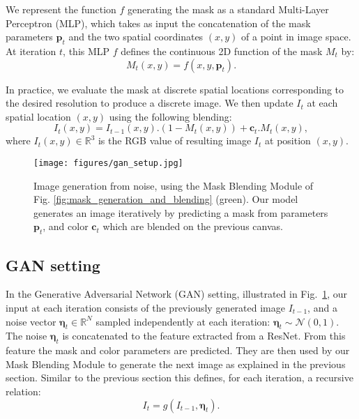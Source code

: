 \documentclass[10pt,twocolumn,letterpaper]{article}
\begin{document}
We represent the function $f$ generating the mask as a standard Multi-Layer Perceptron (MLP), which takes as input the concatenation of the mask parameters $\mathbf{p}_t$ and the two spatial coordinates $(x,y)$ of a point in image space. At iteration $t$, this MLP $f$ defines the continuous 2D function of the mask $M_t$ by:
\begin{equation}
    M_t(x,y) = f(x,y,\mathbf{p}_t).
\end{equation}

In practice, we evaluate the mask at discrete spatial locations corresponding to the desired resolution to produce a discrete image.
We then update $I_{t}$ at each spatial location $(x,y)$ using the following blending: 
\begin{equation}
I_{t}(x,y) = I_{t-1}(x,y).(1-M_{t}(x,y)) + \mathbf{c}_t.M_{t}(x,y),
\label{alpha_blending}
\end{equation}
where $I_{t}(x,y)\in \mathbb{R}^3$ is the RGB value of resulting image $I_t$ at position $(x,y)$.

\begin{figure}[htb]
\centering
\texttt{[image: figures/gan\_setup.jpg]}
\caption{Image generation from noise, using the Mask Blending Module of Fig. \ref{fig:mask_generation_and_blending} (green). Our model generates an image iteratively by predicting a mask from parameters $\mathbf{p}_t$, and color $\mathbf{c}_t$ which are blended on the previous canvas.}
\label{fig:GAN_setup} 
\end{figure}

\subsection{GAN setting}

In the Generative Adversarial Network (GAN) setting, illustrated in Fig.~\ref{fig:GAN_setup}, our input at each iteration consists of the previously generated image $I_{t-1}$, and a noise vector $\mathbf{\eta}_t \in \mathbb{R}^N$ sampled independently at each iteration: $\mathbf{\eta}_t \sim \mathcal{N}(0,1)$.
{The noise $\mathbf{\eta}_t$ is concatenated to the feature extracted from a ResNet. From this feature the mask and color parameters are predicted. They are then used by our Mask Blending Module to generate the next image as explained in the previous section.} 
Similar to the previous section this defines, for each iteration, a recursive relation:
\begin{equation}
I_t = g(I_{t-1}, \mathbf{\eta}_t).
\label{eq:ganset}
\end{equation}
\end{document}
